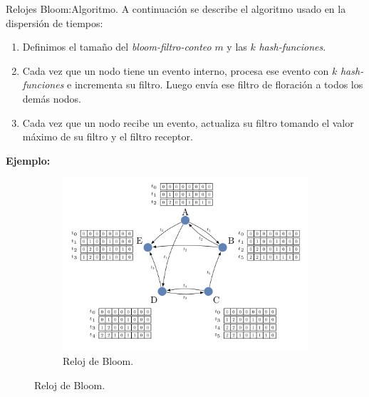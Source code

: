 \begin{frame}[fragile]{Relojes Bloom:}{Algoritmo.}
  \justifying
  A continuación se describe el algoritmo usado en la
  dispersión de tiempos:
  \begin{enumerate}
  \item Definimos el tamaño del \textit{bloom-filtro-conteo}
    $m$ y las $k$ \textit{hash-funciones}.
  \item Cada vez que un nodo tiene un evento interno, procesa ese evento
    con $k$ \textit{hash-funciones} e incrementa su filtro. Luego envía
    ese filtro de floración a todos los demás nodos.
  \item Cada vez que un nodo recibe un evento, actualiza su filtro
    tomando el valor máximo de su filtro y el filtro receptor.
  \end{enumerate}
  \textbf{Ejemplo:}
      \begin{figure}
    \centering
    \begin{subfigure}[b]{0.45\textwidth}
      \includegraphics[width=\textwidth]{./Imagenes/RelojBloom}
      \caption{Reloj de Bloom.}
      \label{fig:Ejemplo de un CountingBloomClock.}
    \end{subfigure}
  \end{figure}
\end{frame}

